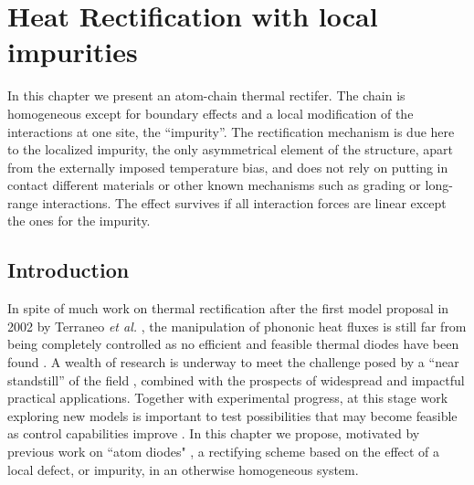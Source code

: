 
\chapter{Heat Rectification with local impurities}
\label{Chapter4}
%
In this chapter we present an atom-chain thermal rectifer. The chain is homogeneous except for boundary effects and a local modification of the interactions at one site, the ``impurity''. The rectification mechanism is due here to the localized impurity, the only asymmetrical element of the structure, apart from the externally imposed temperature bias,  and does not rely on putting in contact different materials or other known mechanisms such as grading or long-range interactions.  The effect survives if all interaction forces are linear except the ones for the impurity.
%
\newpage
%

\section{Introduction}

In spite of much work on thermal rectification
after the first model proposal in 2002  by Terraneo \textit{et al. }\cite{Terraneo2002}, the manipulation of phononic heat fluxes is still far from being completely controlled as no efficient and feasible thermal diodes have been found \cite{Chen2015,Pereira2017}. A wealth of research is underway to meet the challenge posed by  a ``near standstill'' of the field \cite{Chen2015,Pereira2017},
combined with the prospects of widespread and impactful practical applications. Together with experimental progress, at this stage work exploring new models is important to test possibilities that may become feasible as control capabilities improve \cite{Roberts2011}. In this chapter  we propose,
motivated by previous work on ``atom diodes"  \cite{Ruschhaupt2004,Raizen2005}, a rectifying scheme
based on the effect of a local defect, or impurity,
in an otherwise homogeneous system.

